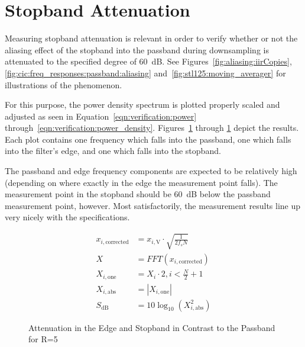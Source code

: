 \section{Stopband Attenuation} %
\label{sec:verification:snr}

Measuring stopband attenuation  is relevant in order to verify  whether or not
the aliasing effect  of the stopband into the passband  during downsampling is
attenuated to the specified degree of \SI{60}{\dB}. See
Figures~\ref{fig:aliasing:iirCopies},
\ref{fig:cic:freq_responses:passband:aliasing}
and~\ref{fig:stl125:moving_averager} for illustrations of the phenomenon.

For this purpose,  the power density spectrum is plotted
properly scaled and adjusted  as seen in Equation~\ref{eqn:verification:power}
through~\ref{eqn:verification:power_density}. 
Figures~\ref{fig:verification:fB5}  through \ref{fig:verification:fB5}  depict
the results. Each plot  contains one frequency which falls  into the passband,
one which falls into the filter's edge, and one which falls into the stopband.

The passband and edge frequency components  are expected to be relatively high
(depending  on where  exactly in  the edge  the measurement  point falls). The
measurement point  in the stopband  should be \SI{60}{\dB} below  the passband
measurement point, however. Most satisfactorily,  the measurement results line
up very nicely with the specifications.

\begin{align}
    x_{i,\mathrm{corrected}} &= x_{i,\mathrm{V}} \cdot \sqrt{\frac{1}{2f_s N}} \label{eqn:verification:power} \\
    X                        &= FFT\left(x_{i,\mathrm{corrected}}\right)       \\
    X_{i,\mathrm{one}}       &= X_i \cdot 2, i < \frac{N}{2}+1                 \\
    X_{i,\mathrm{abs}}       &= |X_{i,\mathrm{one}}|                           \\
    S_{\si{\dB}}             &= 10\log_{10}(X_{i,\mathrm{abs}}^2)              \label{eqn:verification:power_density}
\end{align}

\begin{figure}
    \centering
    
    \caption[Attenuation in the Edge and Stopband in Contrast to the Passband for R=5]{%
    Attenuation in the Edge and Stopband in Contrast to the Passband for R=5%
    }
    \label{fig:verification:fB5}
\end{figure}

